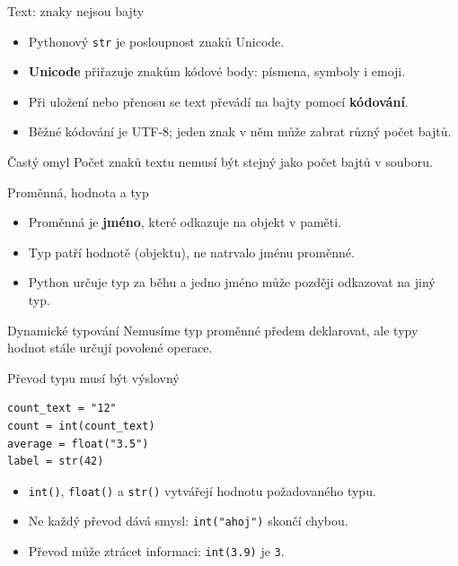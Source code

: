 \documentclass[aspectratio=169]{beamer}
\newcommand{\term}[1]{\textcolor{CodeBlue}{\textbf{#1}}}
\begin{document}
\begin{frame}{Text: znaky nejsou bajty}
  \begin{itemize}
    \item Pythonový \texttt{str} je posloupnost znaků Unicode.
    \item \term{Unicode} přiřazuje znakům kódové body: písmena, symboly i emoji.
    \item Při uložení nebo přenosu se text převádí na bajty pomocí \term{kódování}.
    \item Běžné kódování je UTF-8; jeden znak v něm může zabrat různý počet bajtů.
  \end{itemize}
  \begin{alertblock}{Častý omyl}
    Počet znaků textu nemusí být stejný jako počet bajtů v souboru.
  \end{alertblock}
\end{frame}

\begin{frame}{Proměnná, hodnota a typ}
  \begin{itemize}
    \item Proměnná je \term{jméno}, které odkazuje na objekt v paměti.
    \item Typ patří hodnotě (objektu), ne natrvalo jménu proměnné.
    \item Python určuje typ za běhu a jedno jméno může později odkazovat na jiný typ.
  \end{itemize}
  \begin{block}{Dynamické typování}
    Nemusíme typ proměnné předem deklarovat, ale typy hodnot stále určují povolené operace.
  \end{block}
\end{frame}

\begin{frame}[fragile]{Převod typu musí být výslovný}
\begin{lstlisting}[style=python]
count_text = "12"
count = int(count_text)
average = float("3.5")
label = str(42)
\end{lstlisting}
  \begin{itemize}
    \item \texttt{int()}, \texttt{float()} a \texttt{str()} vytvářejí hodnotu požadovaného typu.
    \item Ne každý převod dává smysl: \texttt{int("ahoj")} skončí chybou.
    \item Převod může ztrácet informaci: \texttt{int(3.9)} je \texttt{3}.
  \end{itemize}
\end{frame}
\end{document}
